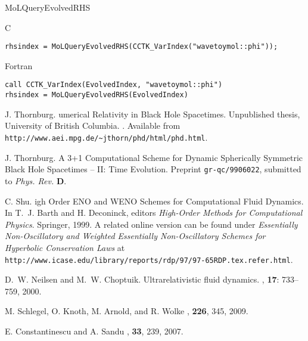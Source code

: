 \begin{FunctionDescription}{MoLQueryEvolvedRHS}
  \begin{ExampleSection}
    \begin{Example}{C}
\begin{verbatim}
rhsindex = MoLQueryEvolvedRHS(CCTK_VarIndex("wavetoymol::phi"));
\end{verbatim}
    \end{Example}
    \begin{Example}{Fortran}
\begin{verbatim}
call CCTK_VarIndex(EvolvedIndex, "wavetoymol::phi")
rhsindex = MoLQueryEvolvedRHS(EvolvedIndex)
\end{verbatim}
    \end{Example}
  \end{ExampleSection}

\end{FunctionDescription}



\begin{thebibliography}{9}

J. Thornburg.
umerical {R}elativity in {B}lack {H}ole {S}pacetimes. 
\newblock Unpublished thesis, University of British Columbia.
.
\newblock Available from \mbox{\tt
  http://www.aei.mpg.de/\~{}jthorn/phd/html/phd.html}. 

J. Thornburg.
\newblock A {3+1} {C}omputational {S}cheme for {D}ynamic {S}pherically
{S}ymmetric {B}lack {H}ole {S}pacetimes -- {II}: {T}ime {E}volution.
\newblock Preprint {\tt gr-qc/9906022}, submitted to {\em Phys. Rev.}
{\bf D}. 

C. Shu.
igh {O}rder {ENO} and {WENO} {S}chemes for
{C}omputational {F}luid {D}ynamics.
\newblock In T.~J. Barth and H. Deconinck, editors {\em High-Order
  Methods for Computational Physics}. Springer, 1999.
\newblock A related online version can be found under {\em Essentially
  {N}on-{O}scillatory and {W}eighted {E}ssentially {N}on-{O}scillatory
  {S}chemes for {H}yperbolic {C}onservation {L}aws} at {\tt
  http://www.icase.edu/library/reports/rdp/97/97-65RDP.tex.refer.html}. 

D.~W. Neilsen and M.~W. Choptuik.
\newblock Ultrarelativistic fluid dynamics.
, {\bf 17}: 733--759, 2000.

M. Schlegel, O. Knoth, M. Arnold, and R. Wolke
, {\bf 226}, 345, 2009.

E. Constantinescu and A. Sandu
, {\bf 33}, 239, 2007.

\end{thebibliography}

